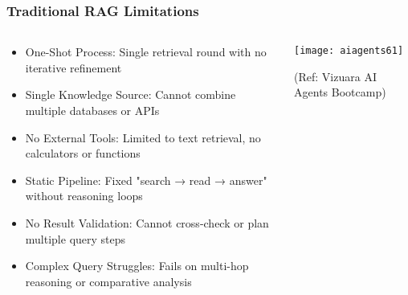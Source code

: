 \begin{frame}[fragile]\frametitle{Traditional RAG Limitations}
\begin{columns}
    \begin{column}[T]{0.6\linewidth}
      \begin{itemize}
		\item One-Shot Process: Single retrieval round with no iterative refinement
		\item Single Knowledge Source: Cannot combine multiple databases or APIs
		\item No External Tools: Limited to text retrieval, no calculators or functions
		\item Static Pipeline: Fixed "search → read → answer" without reasoning loops
		\item No Result Validation: Cannot cross-check or plan multiple query steps
		\item Complex Query Struggles: Fails on multi-hop reasoning or comparative analysis
	  \end{itemize}
    \end{column}
    \begin{column}[T]{0.4\linewidth}
		\begin{center}
		\texttt{[image: aiagents61]}
		
		{\tiny (Ref: Vizuara AI Agents Bootcamp)}		
		\end{center}	
    \end{column}
  \end{columns}
\end{frame}

